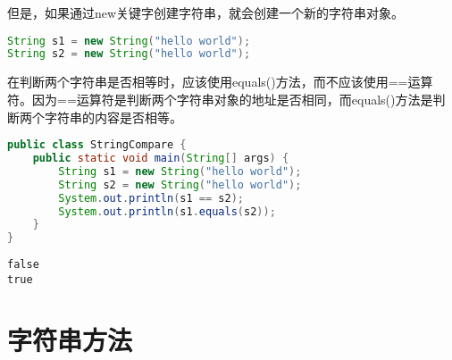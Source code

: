 但是，如果通过new关键字创建字符串，就会创建一个新的字符串对象。

\vspace{-0.5cm}

\begin{lstlisting}[language=Java]
String s1 = new String("hello world");
String s2 = new String("hello world");
\end{lstlisting}

\begin{figure}[H]
	\centering
\end{figure}

在判断两个字符串是否相等时，应该使用equals()方法，而不应该使用==运算符。因为==运算符是判断两个字符串对象的地址是否相同，而equals()方法是判断两个字符串的内容是否相等。\\


\begin{lstlisting}[language=Java]
public class StringCompare {
	public static void main(String[] args) {
		String s1 = new String("hello world");
		String s2 = new String("hello world");
		System.out.println(s1 == s2);
		System.out.println(s1.equals(s2));
	}
}
\end{lstlisting}

\begin{tcolorbox}
	\begin{verbatim}
false
true
	\end{verbatim}
\end{tcolorbox}

\newpage

\section{字符串方法}


